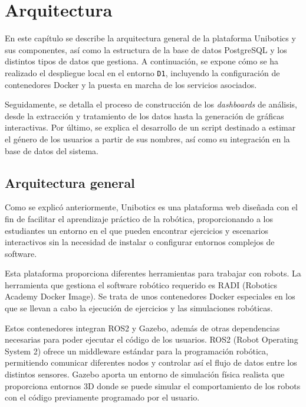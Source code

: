 \documentclass[a4paper, 12pt]{book}
\begin{document}
\chapter{Arquitectura}
\label{chap:diseño}

En este capítulo se describe la arquitectura general de la plataforma Unibotics y sus componentes, así como la estructura de la base de datos PostgreSQL y los distintos tipos de datos que gestiona. A continuación, se expone cómo se ha realizado el despliegue local en el entorno \texttt{D1}, incluyendo la configuración de contenedores Docker y la puesta en marcha de los servicios asociados.

Seguidamente, se detalla el proceso de construcción de los \textit{dashboards} de análisis, desde la extracción y tratamiento de los datos hasta la generación de gráficas interactivas. Por último, se explica el desarrollo de un script destinado a estimar el género de los usuarios a partir de sus nombres, así como su integración en la base de datos del sistema.

\section{Arquitectura general} 
\label{sec:arquitectura}

Como se explicó anteriormente, Unibotics es una plataforma web diseñada con el fin de facilitar el aprendizaje práctico de la robótica, proporcionando a los estudiantes un entorno en el que pueden encontrar ejercicios y escenarios interactivos sin la necesidad de instalar o configurar entornos complejos de software.

Esta plataforma proporciona diferentes herramientas para trabajar con robots. La herramienta que gestiona el software robótico requerido es RADI (Robotics Academy Docker Image). Se trata de unos contenedores Docker especiales en los que se llevan a cabo la ejecución de ejercicios y las simulaciones robóticas.

Estos contenedores integran ROS2 y Gazebo, además de otras dependencias necesarias para poder ejecutar el código de los usuarios. ROS2 (Robot Operating System 2) ofrece un middleware estándar para la programación robótica, permitiendo comunicar diferentes nodos y controlar así el flujo de datos entre los distintos sensores. Gazebo aporta un entorno de simulación física realista que proporciona entornos 3D donde se puede simular el comportamiento de los robots con el código previamente programado por el usuario.
\end{document}
